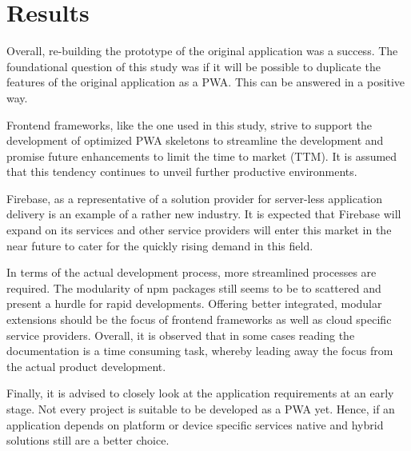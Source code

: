 \chapter{Results}

Overall, re-building the prototype of the original application was a success. The foundational question of this study was if it will be possible to duplicate the features of the original application as a PWA. This can be answered in a positive way.

Frontend frameworks, like the one used in this study, strive to support the development of optimized PWA skeletons to streamline the development and promise future enhancements to limit the time to market (TTM). It is assumed that this tendency continues to unveil further productive environments.

Firebase, as a representative of a solution provider for server-less application delivery is an example of a rather new industry. It is expected that Firebase will expand on its services and other service providers will enter this market in the near future to cater for the quickly rising demand in this field.

In terms of the actual development process, more streamlined processes are required. The modularity of npm packages still seems to be to scattered and present a hurdle for rapid developments. Offering better integrated, modular extensions should be the focus of frontend frameworks as well as cloud specific service providers. Overall, it is observed that in some cases reading the documentation is a time consuming task, whereby leading away the focus from the actual product development.

Finally, it is advised to closely look at the application requirements at an early stage. Not every project is suitable to be developed as a PWA yet. Hence, if an application depends on platform or device specific services native and hybrid solutions still are a better choice.

